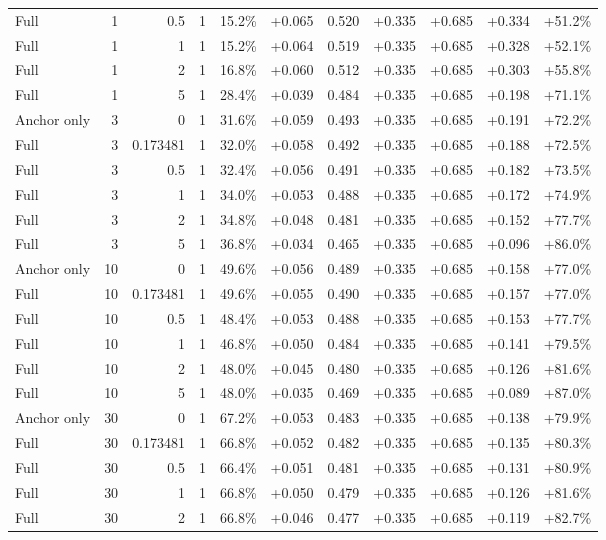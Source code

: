 \begin{table}[htbp]
\begin{tabular}{lrrrccccccc}
Full & 1 & 0.5 & 1 & 15.2\% & +0.065 & 0.520 & +0.335 & +0.685 & +0.334 & +51.2\% \\
Full & 1 & 1 & 1 & 15.2\% & +0.064 & 0.519 & +0.335 & +0.685 & +0.328 & +52.1\% \\
Full & 1 & 2 & 1 & 16.8\% & +0.060 & 0.512 & +0.335 & +0.685 & +0.303 & +55.8\% \\
Full & 1 & 5 & 1 & 28.4\% & +0.039 & 0.484 & +0.335 & +0.685 & +0.198 & +71.1\% \\
Anchor only & 3 & 0 & 1 & 31.6\% & +0.059 & 0.493 & +0.335 & +0.685 & +0.191 & +72.2\% \\
Full & 3 & 0.173481 & 1 & 32.0\% & +0.058 & 0.492 & +0.335 & +0.685 & +0.188 & +72.5\% \\
Full & 3 & 0.5 & 1 & 32.4\% & +0.056 & 0.491 & +0.335 & +0.685 & +0.182 & +73.5\% \\
Full & 3 & 1 & 1 & 34.0\% & +0.053 & 0.488 & +0.335 & +0.685 & +0.172 & +74.9\% \\
Full & 3 & 2 & 1 & 34.8\% & +0.048 & 0.481 & +0.335 & +0.685 & +0.152 & +77.7\% \\
Full & 3 & 5 & 1 & 36.8\% & +0.034 & 0.465 & +0.335 & +0.685 & +0.096 & +86.0\% \\
Anchor only & 10 & 0 & 1 & 49.6\% & +0.056 & 0.489 & +0.335 & +0.685 & +0.158 & +77.0\% \\
Full & 10 & 0.173481 & 1 & 49.6\% & +0.055 & 0.490 & +0.335 & +0.685 & +0.157 & +77.0\% \\
Full & 10 & 0.5 & 1 & 48.4\% & +0.053 & 0.488 & +0.335 & +0.685 & +0.153 & +77.7\% \\
Full & 10 & 1 & 1 & 46.8\% & +0.050 & 0.484 & +0.335 & +0.685 & +0.141 & +79.5\% \\
Full & 10 & 2 & 1 & 48.0\% & +0.045 & 0.480 & +0.335 & +0.685 & +0.126 & +81.6\% \\
Full & 10 & 5 & 1 & 48.0\% & +0.035 & 0.469 & +0.335 & +0.685 & +0.089 & +87.0\% \\
Anchor only & 30 & 0 & 1 & 67.2\% & +0.053 & 0.483 & +0.335 & +0.685 & +0.138 & +79.9\% \\
Full & 30 & 0.173481 & 1 & 66.8\% & +0.052 & 0.482 & +0.335 & +0.685 & +0.135 & +80.3\% \\
Full & 30 & 0.5 & 1 & 66.4\% & +0.051 & 0.481 & +0.335 & +0.685 & +0.131 & +80.9\% \\
Full & 30 & 1 & 1 & 66.8\% & +0.050 & 0.479 & +0.335 & +0.685 & +0.126 & +81.6\% \\
Full & 30 & 2 & 1 & 66.8\% & +0.046 & 0.477 & +0.335 & +0.685 & +0.119 & +82.7\% \\

\end{tabular}
\end{table}
